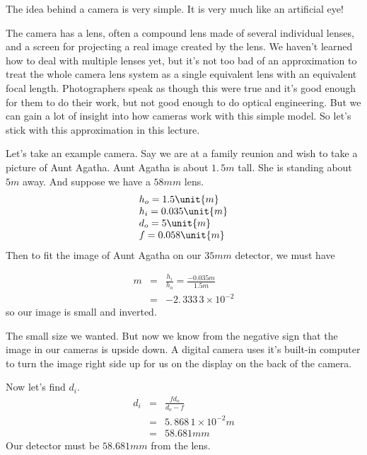 \documentclass{article}
\begin{document}
The idea behind a camera is very simple. It is very much like an artificial
eye!

The camera has a lens, often a compound lens made of several individual
lenses, and a screen for projecting a real image created by the lens. We
haven't learned how to deal with multiple lenses yet, but it's not too bad
of an approximation to treat the whole camera lens system as a single
equivalent lens with an equivalent focal length. Photographers speak as
though this were true and it's good enough for them to do their work, but
not good enough to do optical engineering. But we can gain a lot of insight
into how cameras work with this simple model. So let's stick with this
approximation in this lecture.

Let's take an example camera. Say we are at a family reunion and wish to
take a picture of Aunt Agatha. Aunt Agatha is about $1.\,\allowbreak 5\unit{m%
}$ tall. She is standing about $5\unit{m}$ away. And suppose we have a $58%
\unit{mm}$ lens. 
\[
\begin{tabular}{l}
$h_{o}=1.5\unit{m}$ \\ 
$h_{i}=0.035\unit{m}$ \\ 
$d_{o}=5\unit{m}$ \\ 
$f=0.058\unit{m}$%
\end{tabular}%
\]%
Then to fit the image of Aunt Agatha on our $35\unit{mm}$ detector, we must
have

\begin{eqnarray*}
m &=&\frac{h_{i}}{h_{o}}=\frac{-0.035\unit{m}}{1.5\unit{m}} \\
&=&-2.\,\allowbreak 333\,3\times 10^{-2}
\end{eqnarray*}%
so our image is small and inverted.

The small size we wanted. But now we know from the negative sign that the
image in our cameras is upside down. A digital camera uses it's built-in
computer to turn the image right side up for us on the display on the back
of the camera.

Now let's find $d_{i}.$ 
\begin{eqnarray*}
d_{i} &=&\frac{fd_{o}}{d_{o}-f} \\
&=&5.\,\allowbreak 868\,1\times 10^{-2}\unit{m} \\
&=&58.681\unit{mm}
\end{eqnarray*}%
Our detector must be $58.681\unit{mm}$ from the lens.
\end{document}
